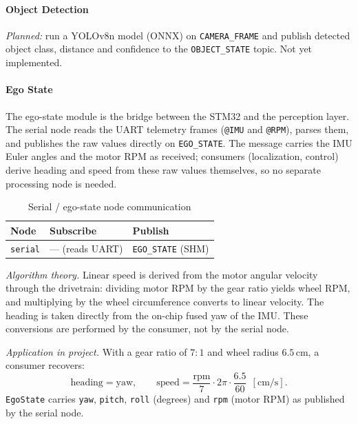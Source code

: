 \documentclass[12pt,a4paper]{article}
\begin{document}
\paragraph{Object Detection}

\textit{Planned:} run a YOLOv8n model (ONNX) on \texttt{CAMERA\_FRAME} and publish
detected object class, distance and confidence to the \texttt{OBJECT\_STATE} topic.
Not yet implemented.

\paragraph{Ego State}

The ego-state module is the bridge between the STM32 and the perception layer.
The serial node reads the UART telemetry frames (\texttt{@IMU} and \texttt{@RPM}),
parses them, and publishes the raw values directly on \texttt{EGO\_STATE}. The
message carries the IMU Euler angles and the motor RPM as received; consumers
(localization, control) derive heading and speed from these raw values
themselves, so no separate processing node is needed.

\begin{table}[H]
\centering
\begin{tabular}{lll}
\hline
\textbf{Node} & \textbf{Subscribe} & \textbf{Publish} \\
\hline
\texttt{serial} & --- (reads UART) & \texttt{EGO\_STATE} (SHM) \\
\hline
\end{tabular}
\caption{Serial / ego-state node communication}
\end{table}

\textit{Algorithm theory.}
Linear speed is derived from the motor angular velocity through the drivetrain:
dividing motor RPM by the gear ratio yields wheel RPM, and multiplying by the
wheel circumference converts to linear velocity. The heading is taken directly
from the on-chip fused yaw of the IMU. These conversions are performed by the
consumer, not by the serial node.

\textit{Application in project.}
With a gear ratio of $7{:}1$ and wheel radius $6.5$\,cm, a consumer recovers:
\[
  \text{heading} = \text{yaw}, \qquad
  \text{speed} = \frac{\text{rpm}}{7} \cdot 2\pi \cdot \frac{6.5}{60}\;\,[\text{cm/s}].
\]
\texttt{EgoState} carries \texttt{yaw}, \texttt{pitch}, \texttt{roll} (degrees)
and \texttt{rpm} (motor RPM) as published by the serial node.
\end{document}

